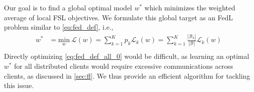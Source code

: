 Our goal is to find a global optimal model $w^*$ which minimizes the weighted average of local FSL objectives. We formulate this global target as an FedL problem similar to \eqref{eq:fed_def}, i.e., 
\begin{equation}
\begin{split}
w^* &= \underset{w}{\text{min}} \ \mathcal{L}(w) = \sum_{k=1}^{K} p_k \mathcal{L}_k(w) = \sum_{k=1}^{K} \frac{|\mathcal{B}_k|}{|\mathcal{B}|} 
 \mathcal{L}_k(w) \\
\end{split}
\label{eq:fed_def_all_0}
\end{equation}
Directly optimizing \eqref{eq:fed_def_all_0} would be difficult, as learning an optimal $w^*$ for all distributed clients would require excessive communications across clients, as discussed in \ref{sec:fl}. We thus provide an efficient algorithm for tackling this issue. 


